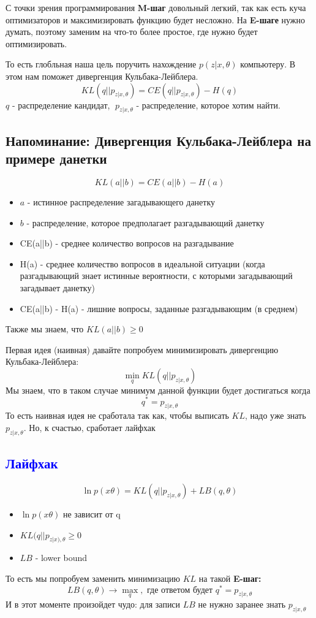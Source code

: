 \documentclass[10pt, a4paper]{extarticle}
\renewcommand{\geq}{\geqslant}
\begin{document}
С точки зрения программирования \textbf{M-шаг} довольный легкий, так как есть куча оптимизаторов и максимизировать функцию будет несложно. На \textbf{E-шаге} нужно думать, поэтому заменим на что-то более простое, где нужно будет оптимизировать.


То есть глобльная наша цель поручить нахождение $p(z|x, \theta)$ компьютеру. В этом нам поможет дивергенция Кульбака-Лейблера.
\[
    KL(q||p_{z|x, \theta}) = CE(q || p_{z|x, \theta}) - H(q)
\]
$q$ - распределение кандидат, $\;p_{z|x, \theta}$ - распределение, которое хотим найти.

\subsection*{\textcolor{mypink1}{Напоминание: Дивергенция Кульбака-Лейблера на примере данетки}}
\[
     KL(a || b) = CE(a || b) - H(a)
\]

\begin{itemize}
    \item $a$ - истинное распределение загадывающего данетку
    \item $b$ - распределение, которое предполагает разгадывающий данетку
    \item CE(a||b) - среднее количество вопросов на разгадывание 
    \item H(a)  - среднее количество вопросов в идеальной ситуации (когда разгадывающий знает истинные вероятности, с которыми загадывающий загадывает данетку)
    \item CE(a||b) - H(a)  - лишние вопросы, заданные разгадывающим (в среднем)
\end{itemize}

Также мы знаем, что $KL(a || b) \geq 0$

Первая идея (наивная) давайте попробуем минимизировать дивергенцию Кульбака-Лейблера:
\[
\min_{q}KL(q|| p_{z|x, \theta}) 
\]
Мы знаем, что в таком случае минимум данной функции будет достигаться когда 
\[q^* = p_{z|x, \theta}\]
То есть наивная идея не сработала так как, чтобы выписать $KL$, надо уже знать $p_{z|x, \theta}$. Но, к счастью, сработает лайфхак
\subsection*{\textcolor{blue}{Лайфхак}}
\[
\ln p(x\theta) = KL(q || p_{z|x, \theta}) + LB(q, \theta)
\]
\begin{itemize}
    \item $\ln p(x\theta)$ не зависит от q
    \item $KL(q || p_{z|x), \theta} \geq 0$ 
    \item $LB$ - lower bound
    
\end{itemize}
То есть мы попробуем заменить минимизацию $KL$ на такой 
\textbf{E-шаг:}
\[
LB(q, \theta) \rightarrow \max_{q}, \text{ где ответом будет } q^* = p_{z|x, \theta}
\]
И в этот моменте произойдет чудо: для записи $LB$ не нужно заранее знать $p_{z|x, \theta}$ 
\end{document}
